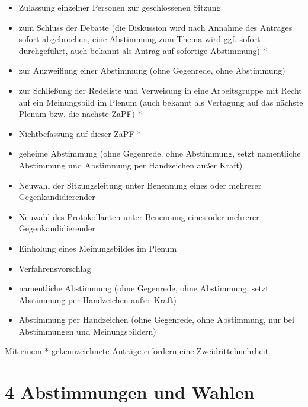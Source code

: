 \documentclass[12pt,oneside]{scrartcl}
\begin{document}
\begin{enumerate}
\begin{itemize}
\item Zulassung einzelner Personen zur geschlossenen Sitzung

\item zum Schluss der Debatte (die Diskussion wird nach Annahme des
Antrages sofort abgebrochen, eine Abstimmung zum Thema wird ggf.
sofort durchgeführt, auch bekannt als \textquotedbl{}Antrag auf sofortige Abstimmung\textquotedbl{}) *

\item zur Anzweiflung einer Abstimmung (ohne Gegenrede, ohne Abstimmung)

\item zur Schließung der Redeliste und Verweisung in eine Arbeitsgruppe mit
Recht auf ein Meinungsbild im Plenum (auch bekannt als \textquotedbl{}Vertagung auf das
nächste Plenum bzw. die nächste ZaPF\textquotedbl{}) *

\item Nichtbefassung auf dieser ZaPF *

\item geheime Abstimmung (ohne Gegenrede, ohne Abstimmung, setzt namentliche
Abstimmung und Abstimmung per Handzeichen außer Kraft)

\item Neuwahl der Sitzungsleitung unter Benennung eines oder mehrerer Gegenkandidierender

\item Neuwahl des Protokollanten unter Benennung eines oder mehrerer Gegenkandidierender

\item Einholung eines Meinungsbildes im Plenum

\item Verfahrensvorschlag

\item namentliche Abstimmung (ohne Gegenrede, ohne Abstimmung, setzt Abstimmung
per Handzeichen außer Kraft)

\item Abstimmung per Handzeichen (ohne Gegenrede, ohne Abstimmung, nur bei
Abstimmungen und Meinungsbildern)
\end{itemize}

Mit einem * gekennzeichnete Anträge erfordern eine Zweidrittelmehrheit.
\end{enumerate}


\section{4 Abstimmungen und Wahlen%
  \label{abstimmungen-und-wahlen}%
}
\end{document}
